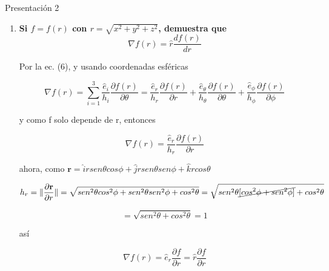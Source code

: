 \documentclass[12pt,a4paper]{article}
\providecommand{\norm}[1]{\lVert#1\rVert}
\begin{document}
Presentación 2
\begin{enumerate}





    \item \textbf{Si $f = f(r)$ con $r = \sqrt{x^2 + y^2 + z^2}$, demuestra que}
    \begin{equation*}
        \nabla f(r) = \hat{r} \frac{df(r)}{dr}
    \end{equation*}
    
    Por la ec. (6), y usando coordenadas esféricas
    
    \begin{equation*}
        \nabla f(r) = \sum_{i=1}^{3} \frac{\hat{e}_i}{h_i} \frac{\partial f(r)}{\partial \theta} = \frac{\hat{e}_r}{h_r} \frac{\partial f(r)}{\partial r} + \frac{\hat{e}_\theta}{h_\theta} \frac{\partial f(r)}{\partial \theta} + \frac{\hat{e}_\phi}{h_\phi} \frac{\partial f(r)}{\partial \phi}
    \end{equation*}
    
    y como f solo depende de r, entonces
    
    \begin{equation*}
        \nabla f(r) = \frac{\hat{e}_r}{h_r} \frac{\partial f (r)}{\partial r}
    \end{equation*}
    
    ahora, como $\textbf{r} = \hat{i} r sen\theta cos\phi + \hat{j} r sen\theta sen \phi + \hat{k}r cos\theta$
    
    \begin{equation*}
        h_r = \norm{\frac{\partial \textbf{r}}{\partial r}} = \sqrt{sen^2\theta cos^2 \phi + sen^2 \theta sen^2 \phi + cos^2 \theta} = \sqrt{sen^2 \theta \cancel{[cos^2\phi +sen^2 \phi]} + cos^2\theta}
    \end{equation*}
    
    \begin{equation*}
        = \sqrt{sen^2\theta + cos^2\theta} = 1
    \end{equation*}
    
    así
    
    \begin{equation*}
        \nabla f(r) = \hat{e}_r \frac{\partial f}{\partial r} = \hat{r} \frac{\partial f}{\partial r}
    \end{equation*}
    

    
    
    
    

\end{enumerate}
\end{document}
